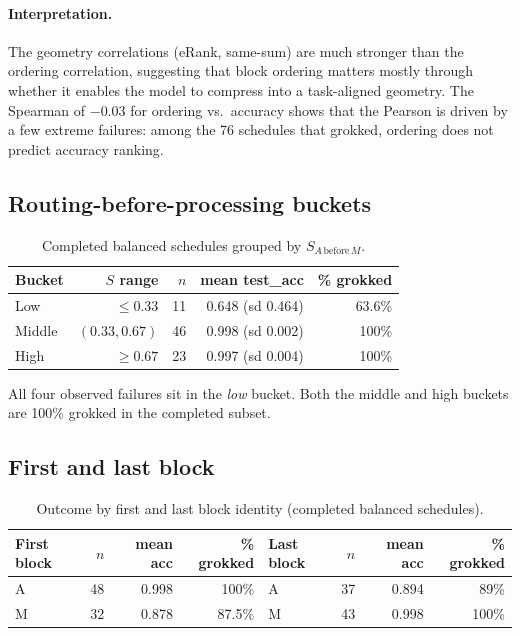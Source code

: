 \documentclass[10pt]{article}
\begin{document}
\paragraph{Interpretation.}
The geometry correlations (eRank, same-sum) are much stronger than the ordering correlation, suggesting that block ordering matters mostly through whether it enables the model to compress into a task-aligned geometry. The Spearman of $-0.03$ for ordering vs.\ accuracy shows that the Pearson is driven by a few extreme failures: among the 76 schedules that grokked, ordering does not predict accuracy ranking.

\subsection{Routing-before-processing buckets}

\begin{table}[h]
\centering
\caption{Completed balanced schedules grouped by $S_{A\,\text{before}\,M}$.}
\label{tab:buckets}
\begin{tabular}{lrrrr}
\toprule
Bucket & $S$ range & $n$ & mean test\_acc & \% grokked\\
\midrule
Low    & $\leq 0.33$ & 11 & 0.648 (sd 0.464) & 63.6\% \\
Middle & $(0.33, 0.67)$ & 46 & 0.998 (sd 0.002) & 100\%  \\
High   & $\geq 0.67$ & 23 & 0.997 (sd 0.004) & 100\%  \\
\bottomrule
\end{tabular}
\end{table}

All four observed failures sit in the \emph{low} bucket. Both the middle and high buckets are 100\% grokked in the completed subset.

\subsection{First and last block}

\begin{table}[h]
\centering
\caption{Outcome by first and last block identity (completed balanced schedules).}
\label{tab:first-last-block}
\begin{tabular}{lrrr@{\hspace{2em}}lrrr}
\toprule
First block & $n$ & mean acc & \% grokked & Last block & $n$ & mean acc & \% grokked\\
\midrule
A & 48 & 0.998 & 100\%  & A & 37 & 0.894 & 89\%  \\
M & 32 & 0.878 & 87.5\% & M & 43 & 0.998 & 100\% \\
\bottomrule
\end{tabular}
\end{table}
\end{document}

